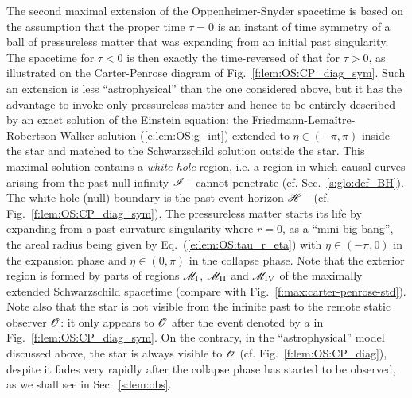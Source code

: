 The second maximal extension of the Oppenheimer-Snyder spacetime
is based on the assumption that the proper time $\tau=0$ is an instant of
time symmetry of a ball of pressureless matter that was expanding from an
initial past singularity. The spacetime for $\tau < 0$ is then exactly the
time-reversed of that for $\tau > 0$, as illustrated on the Carter-Penrose
diagram of Fig.~\ref{f:lem:OS:CP_diag_sym}.
Such an extension is less ``astrophysical'' than the one considered above, but
it has the advantage to invoke only pressureless matter
and hence to be entirely described by an exact solution of the Einstein equation:
the Friedmann-Lemaître-Robertson-Walker solution (\ref{e:lem:OS:g_int})
extended to $\eta \in (-\pi, \pi)$
inside the star and matched to the Schwarzschild solution
outside the star. This maximal solution contains a \emph{white hole} region,
i.e. a region in which causal curves arising from the
past null infinity $\mathscr{I}^-$ cannot penetrate (cf. Sec.~\ref{s:glo:def_BH}).
The white hole (null) boundary is the past event horizon $\mathscr{H}^-$ (cf. Fig.~\ref{f:lem:OS:CP_diag_sym}).
The pressureless matter starts its life by expanding from a past curvature singularity where $r=0$,
as a ``mini big-bang'',
the areal radius being given by Eq.~(\ref{e:lem:OS:tau_r_eta}) with $\eta\in (-\pi,0)$
in the expansion phase and $\eta \in (0, \pi)$ in the collapse phase.
Note that the exterior region is formed by parts of regions $\mathscr{M}_{\rm I}$,
$\mathscr{M}_{\rm II}$ and $\mathscr{M}_{\rm IV}$ of the maximally extended
Schwarzschild spacetime (compare with Fig.~\ref{f:max:carter-penrose-std}).
Note also that the star is not visible from the infinite past to the remote static observer
$\mathscr{O}$: it only appears to $\mathscr{O}$
after the event denoted by $a$ in Fig.~\ref{f:lem:OS:CP_diag_sym}.
On the contrary, in the ``astrophysical'' model discussed above,
the star is always visible to $\mathscr{O}$ (cf. Fig.~\ref{f:lem:OS:CP_diag}),
despite it fades very rapidly after the collapse phase has started to be observed,
as we shall see in Sec.~\ref{s:lem:obs}.

